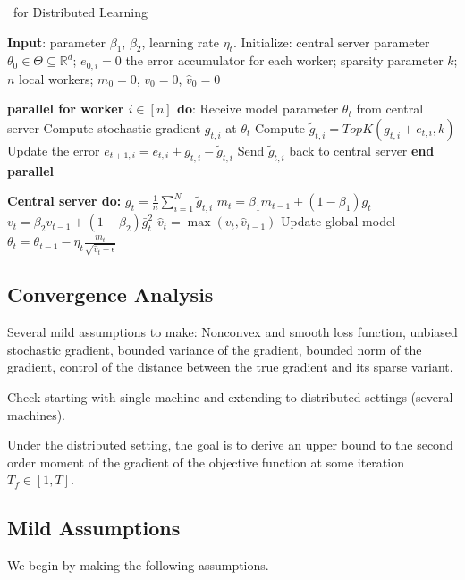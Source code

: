\documentclass[11pt]{article}
\begin{document}
\begin{algorithm}[H]
\caption{\algo\ for Distributed Learning} \label{alg:sparsams}
\begin{algorithmic}[1]

\STATE \textbf{Input}: parameter $\beta_1$, $\beta_2$, learning rate $\eta_t$. 
\STATE Initialize: central server parameter $\theta_{0} \in \Theta \subseteq \mathbb R^d$; $e_{0,i}=0$ the error accumulator for each worker; sparsity parameter $k$; $n$ local workers; $m_0=0$, $v_0=0$, $\hat v_0=0$


\STATE\textbf{parallel for worker $i \in [n]$ do}:
\STATE\quad  Receive model parameter $\theta_{t}$ from central server
\STATE\quad  Compute stochastic gradient $g_{t,i}$ at $\theta_t$
\STATE\quad  Compute $\tilde g_{t,i}=TopK(g_{t,i}+e_{t,i},k)$ \label{line:topk} 
\STATE\quad  Update the error $e_{t+1,i}=e_{t,i}+g_{t,i}-\tilde g_{t,i}$
\STATE\quad  Send $\tilde g_{t,i}$ back to central server
\STATE \textbf{end parallel}

\STATE \textbf{Central server do:}
\STATE $\bar g_{t}=\frac{1}{n}\sum_{i=1}^N \tilde g_{t,i}$
\STATE $m_t=\beta_1 m_{t-1}+(1-\beta_1)\bar g_t$
\STATE $v_t=\beta_2 v_{t-1}+(1-\beta_2)\bar g_t^2$
\STATE $\hat v_t=\max(v_t,\hat v_{t-1})$ \label{line:v}
\STATE Update global model $\theta_t=\theta_{t-1}-\eta_t\frac{m_t}{\sqrt{\hat v_t+\epsilon}}$

\ENDFOR
\end{algorithmic}
\end{algorithm}


\subsection{Convergence Analysis}

Several mild assumptions to make: Nonconvex and smooth loss function, unbiased stochastic gradient, bounded variance of the gradient, bounded norm of the gradient, control of the distance between the true gradient and its sparse variant.

Check \citep{chen2020quantized} starting with single machine  and extending to distributed settings (several machines).


Under the distributed setting, the goal is to derive an upper bound to the second order moment of the gradient of the objective function at some iteration $T_f \in [1, T]$.

\subsection{Mild Assumptions}
We begin by making the following assumptions.
\end{document}
